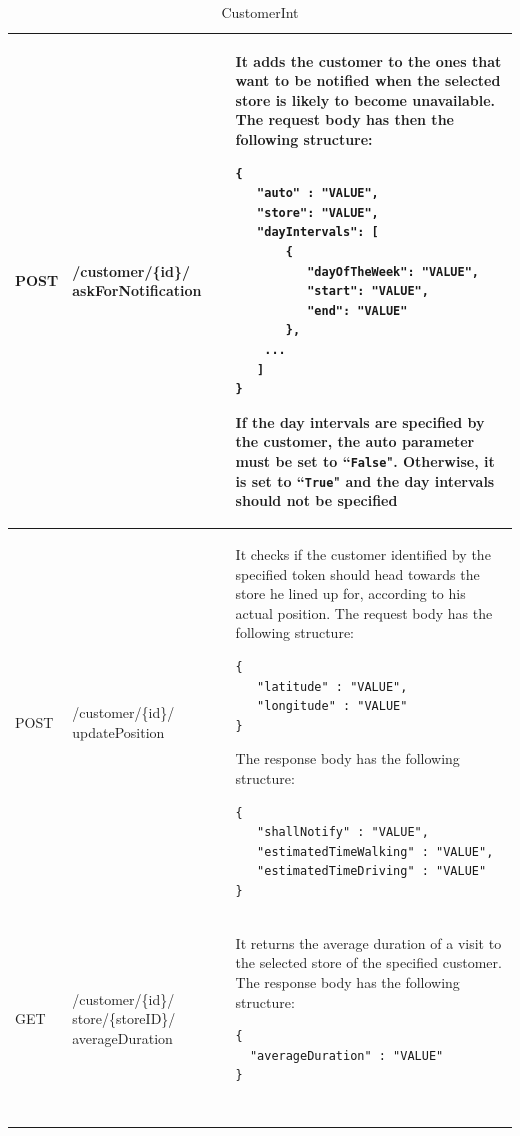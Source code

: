 \documentclass[a4paper,oneside,11pt]{book}
\begin{document}
\begin{longtable}[c] { |>{\centering\arraybackslash}P{0.11\textwidth}|>{\centering\arraybackslash\ttfamily}H{0.23\textwidth}|H{0.50\textwidth}| }
        POST & /customer/\{id\}/ askForNotification & It adds the customer to the ones that want to be notified when the selected store is likely to become unavailable. The request body has then the following structure:
        \begin{lstlisting}[language=jsonDD]
{
   "auto" : "VALUE",
   "store": "VALUE",
   "dayIntervals": [
       {
          "dayOfTheWeek": "VALUE",
          "start": "VALUE",
          "end": "VALUE"
       }, 
    ...
   ]
}
        \end{lstlisting} If the day intervals are specified by the customer, the auto parameter must be set to ``\texttt{False}". Otherwise, it is set to ``\texttt{True}" and the day intervals should not be specified \\ \hline
        POST & /customer/\{id\}/ updatePosition & It checks if the customer identified by the specified token should head towards the store he lined up for, according to his actual position. The request body has the following structure:
        \begin{lstlisting}[language=jsonDD]
{
   "latitude" : "VALUE",
   "longitude" : "VALUE"
}
        \end{lstlisting} 
         The response body has the following structure:
        \begin{lstlisting}[language=jsonDD]
{
   "shallNotify" : "VALUE",
   "estimatedTimeWalking" : "VALUE",
   "estimatedTimeDriving" : "VALUE"
}
        \end{lstlisting} 
        \\ \hline
        GET & /customer/\{id\}/ store/\{storeID\}/ averageDuration & It returns the average duration of a visit to the selected store of the specified customer. The response body has the following structure: 
        \begin{lstlisting}[language=jsonDD]
{
  "averageDuration" : "VALUE"
}
    
        \end{lstlisting} \\ \hline
        \caption{CustomerInt}
        \label{table:customer_int}
    \end{longtable}
    
\end{document}
